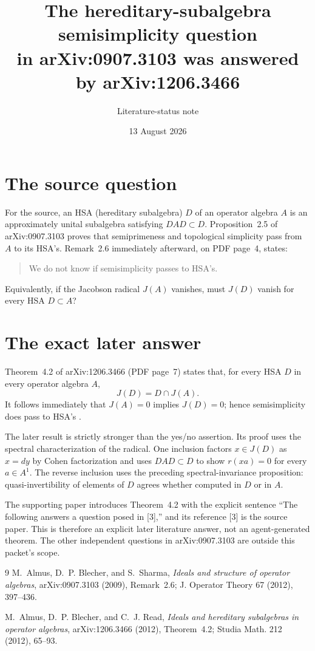 \documentclass[11pt]{article}
\title{The hereditary-subalgebra semisimplicity question\\
in arXiv:0907.3103 was answered by arXiv:1206.3466}
\author{Literature-status note}
\date{13 August 2026}
\begin{document}
\maketitle

\begin{center}
\end{center}

\section{The source question}

For the source, an HSA (hereditary subalgebra) $D$ of an operator algebra
$A$ is an approximately unital subalgebra satisfying $DAD\subset D$.
Proposition~2.5 of arXiv:0907.3103 proves that semiprimeness and topological
simplicity pass from $A$ to its HSA's.  Remark~2.6 immediately afterward,
on PDF page~4, states:
\begin{quote}
We do not know if semisimplicity passes to HSA's.
\end{quote}
Equivalently, if the Jacobson radical $J(A)$ vanishes, must $J(D)$ vanish
for every HSA $D\subset A$? \cite{ABS09}

\section{The exact later answer}

Theorem~4.2 of arXiv:1206.3466 (PDF page~7) states that, for every HSA
$D$ in every operator algebra $A$,
\[
 \boxed{J(D)=D\cap J(A).}
\]
It follows immediately that $J(A)=0$ implies $J(D)=0$; hence
semisimplicity does pass to HSA's \cite{ABR12}.

The later result is strictly stronger than the yes/no assertion.  Its proof
uses the spectral characterization of the radical.  One inclusion factors
$x\in J(D)$ as $x=dy$ by Cohen factorization and uses $DAD\subset D$ to
show $r(xa)=0$ for every $a\in A^1$.  The reverse inclusion uses the
preceding spectral-invariance proposition: quasi-invertibility of elements
of $D$ agrees whether computed in $D$ or in $A$.

The supporting paper introduces Theorem~4.2 with the explicit sentence
``The following answers a question posed in [3],'' and its reference [3] is
the source paper.  This is therefore an explicit later literature answer,
not an agent-generated theorem.  The other independent questions in
arXiv:0907.3103 are outside this packet's scope.

\begin{thebibliography}{9}
M.~Almus, D.~P. Blecher, and S.~Sharma,
\emph{Ideals and structure of operator algebras},
arXiv:0907.3103 (2009), Remark~2.6;
J. Operator Theory 67 (2012), 397--436.

M.~Almus, D.~P. Blecher, and C.~J. Read,
\emph{Ideals and hereditary subalgebras in operator algebras},
arXiv:1206.3466 (2012), Theorem~4.2;
Studia Math. 212 (2012), 65--93.
\end{thebibliography}
\end{document}
